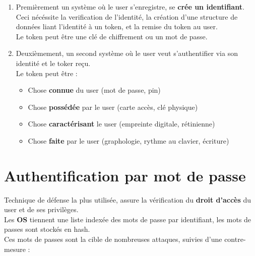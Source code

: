 \documentclass{report}
\begin{document}
		\begin{enumerate}
			\item Premièrement un système où le user s'enregistre, se \textbf{crée un identifiant}.\\
			Ceci nécéssite la verification de l'identité, la création d'une structure de données liant l'identité à un token, et la remise du token au user.\\
			Le token peut être une clé de chiffrement ou un mot de passe.\\
			\item Deuxièmement, un second système où le user veut s'authentifier via son identité et le toker reçu.\\
			Le token peut être : \\
			\begin{itemize}
				\item Chose \textbf{connue} du user (mot de passe, pin)
				\item Chose \textbf{possédée} par le user (carte accès, clé physique)
				\item Chose \textbf{caractérisant} le user (empreinte digitale, rétinienne)
				\item Chose \textbf{faite} par le user (graphologie, rythme au clavier, écriture)\\
			\end{itemize}
		\end{enumerate}

	\section{Authentification par mot de passe}

		Technique de défense la plus utilisée, assure la vérification du \textbf{droit d'accès} du user et de ses privilèges.\\

		Les \textbf{OS} tiennent une liste indexée des mots de passe par identifiant, les mots de passes sont stockés en hash.\\

		Ces mots de passes sont la cible de nombreuses attaques, suivies d'une contre-mesure : \\
\end{document}
